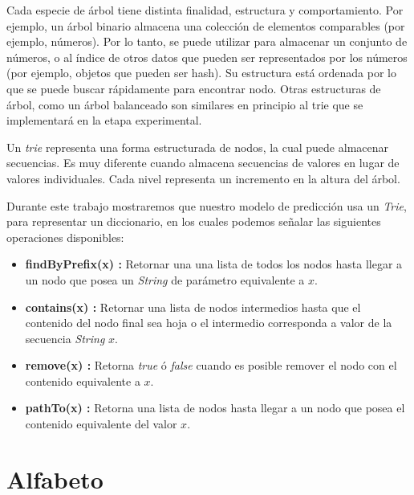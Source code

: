 Cada especie de árbol tiene distinta finalidad, estructura y comportamiento. Por ejemplo, un árbol binario almacena una colección de elementos comparables (por ejemplo, números). Por lo tanto, se puede utilizar para almacenar un conjunto de números, o al índice de otros datos que pueden ser representados por los números (por ejemplo, objetos que pueden ser hash). Su estructura está ordenada por lo que se puede buscar rápidamente para encontrar nodo. Otras estructuras de árbol, como un árbol balanceado son similares en principio al trie que se implementará en la etapa experimental.

Un \emph{trie} representa una forma  estructurada de nodos, la cual puede almacenar secuencias. %
Es muy diferente cuando almacena secuencias de valores en lugar de valores individuales. Cada nivel representa un incremento en la altura del árbol.


Durante este trabajo mostraremos que nuestro modelo de predicción usa un \emph{Trie}, para representar un diccionario, en los cuales podemos señalar las siguientes operaciones disponibles:

	\begin{itemize}	
		\item \textbf{findByPrefix(x) :}  Retornar una una lista de todos los nodos hasta llegar a un nodo que posea un \emph{String} de parámetro equivalente a $x$.
		
		\item \textbf{contains(x) :} Retornar una lista de nodos intermedios hasta que el contenido del nodo final sea hoja o el intermedio corresponda a valor de la secuencia \emph{String} $x$.
		
		\item \textbf{remove(x) :} Retorna \emph{true} ó \emph{false} cuando es posible remover el nodo con el contenido equivalente a $x$.
		
		\item \textbf{pathTo(x) :} Retorna una lista de nodos hasta llegar a un nodo que posea el contenido equivalente del valor $x$.
	\end{itemize}







\section{Alfabeto}

